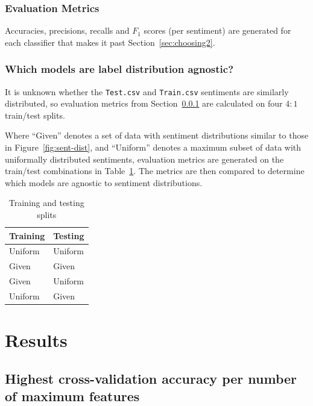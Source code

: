 \documentclass[11pt]{article}
\begin{document}
\subsubsection{Evaluation Metrics}\label{sec:evalmetrics}

Accuracies, precisions, recalls and $F_1$ scores (per sentiment) are generated for each classifier that makes it past Section~\ref{sec:choosing2}.

\subsubsection{Which models are label distribution agnostic?}

It is unknown whether the \texttt{Test.csv} and \texttt{Train.csv} sentiments are similarly distributed, 
so evaluation metrics from Section~\ref{sec:evalmetrics} are calculated on four $4:1$ train/test splits.

Where ``Given'' denotes a set of data with sentiment distributions similar to those in Figure~\ref{fig:sent-dist},
and ``Uniform'' denotes a maximum subset of data with uniformally distributed sentiments,
evaluation metrics are generated on the train/test combinations in Table~\ref{tbl:train-test}.
The metrics are then compared to determine which models are agnostic to sentiment distributions.

\begin{table}[H]
	\begin{center}
		\begin{tabular}{|l|l|}			
			\hline
			Training & Testing \\
			\hline
			Uniform & Uniform \\
			Given & Given \\
			Given & Uniform \\
			Uniform & Given \\
			\hline
		\end{tabular}
		\caption{Training and testing splits}
		\label{tbl:train-test}
	\end{center}
\end{table}

\section{Results}\label{sec:results}

\subsection{Highest cross-validation accuracy per number of maximum features}\label{sec:mfresults}
\end{document}
